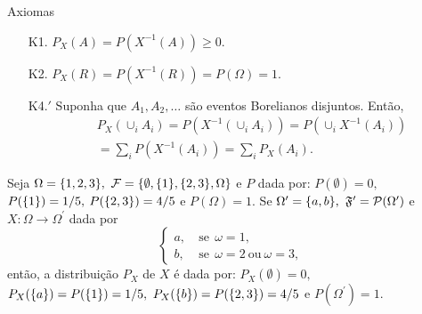 \begin{frame}

\begin{block}{Axiomas}
	
	\begin{enumerate}
		\item[K1.] $P_X(A)=P(X^{-1}(A))\geq 0$.
		\item[K2.] $P_X(R)=P(X^{-1}(R))=P(\Omega)=1$.
		\item[K4.$\!'$] Suponha que $A_1, A_2, \ldots$ são eventos Borelianos
		disjuntos. Então,
		\begin{eqnarray}
		& & P_X(\cup_i A_i)=P(X^{-1}(\cup_i A_i))=P(\cup_i X^{-1}(A_i)) \nonumber \\
		& & =\sum_i P(X^{-1}(A_i))=\sum_i P_X(A_i). \nonumber
		\end{eqnarray}
	\end{enumerate}
\end{block}


\begin{exem}
	Seja $\Omega=\{{1,2,3}\},$ ${\cal F} = \{{\emptyset, \{{1}\}, \{{2,3}\},
		\Omega}\}$ e $P$ dada por: $P(\emptyset)=0,$ $P( \{{1}\})= 1/5,$
	$P(\{{2,3}\})=4/5$ e $P(\Omega)=1.$ Se
	$\Omega^{\prime}=\{{a,b}\},$ $\frak{F}^{\prime }={\cal P}(\Omega^{\prime})$ e 
	$X:\Omega \rightarrow \Omega^{\prime}$ dada por 
	$$
	\begin{cases}
	a,& \ \text{se}  \ \ \omega =1, \\
	b, & \ \text{se} \ \ \omega =2 \ \text{ou}  \ \omega=3,
	\end{cases}
	$$
	então, a distribuição $P_X$ de $X$ é dada por:
	$P_X(\emptyset)=0,$ $P_X(\{{a}\})=P( \{{1}\})= 1/5,$
	$P_X(\{{b}\})=P(\{{2,3}\})=4/5$ e $P(\Omega^{\prime})=1.$
\end{exem}
\end{frame}

